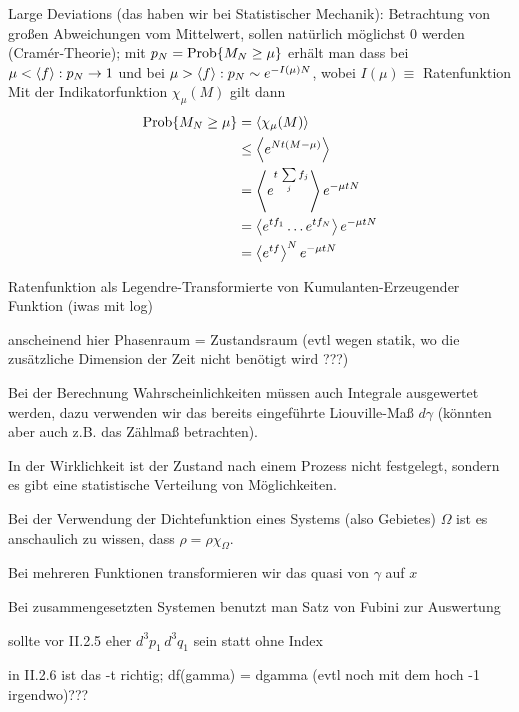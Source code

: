 Large Deviations (das haben wir bei Statistischer Mechanik): Betrachtung von großen Abweichungen vom Mittelwert, sollen natürlich möglichst 0 werden (Cramér-Theorie); mit $p_N = \text{Prob}\qty{M_N \geq \mu}$ erhält man dass bei $\mu < \expval{f}: p_N \rightarrow 1$ und bei $\mu > \expval{f}: p_N \sim e^{-I(\mu) N}$, wobei $I(\mu) \equiv$ Ratenfunktion
Mit der Indikatorfunktion $\chi_\mu(M)$ gilt dann
\begin{align}\label{key}
\text{Prob}\qty{M_N \geq \mu} &= \expval{ \chi_\mu(M)}
\notag\\
&\leq \expval{e^{N t (M - \mu)}}
\notag\\
&= \expval{e^{t \, \sum\limits_j f_j}} e^{-\mu t N}
\notag\\
&= \expval{e^{t f_1} \dots e^{t f_N}} e^{-\mu t N}
\notag\\
&= \expval{e^{t f}}^N e^{-\mu t N}
\end{align}

Ratenfunktion als Legendre-Transformierte von Kumulanten-Erzeugender Funktion (iwas mit log)



anscheinend hier Phasenraum = Zustandsraum (evtl wegen statik, wo die zusätzliche Dimension der Zeit nicht benötigt wird ???)

Bei der Berechnung Wahrscheinlichkeiten müssen auch Integrale ausgewertet werden, dazu verwenden wir das bereits eingeführte Liouville-Maß $d\gamma$ (könnten aber auch z.B. das Zählmaß betrachten).

In der Wirklichkeit ist der Zustand nach einem Prozess nicht festgelegt, sondern es gibt eine statistische Verteilung von Möglichkeiten.

Bei der Verwendung der Dichtefunktion eines Systems (also Gebietes) $\Omega$ ist es anschaulich zu wissen, dass $\rho = \rho \chi_\Omega$. %

Bei mehreren Funktionen transformieren wir das quasi von $\gamma$ auf $x$

Bei zusammengesetzten Systemen benutzt man Satz von Fubini zur Auswertung

sollte vor II.2.5 eher $d^3p_1 \, d^3q_1$ sein statt ohne Index

in II.2.6 ist das -t richtig; df(gamma) = dgamma (evtl noch mit dem hoch -1 irgendwo)???

